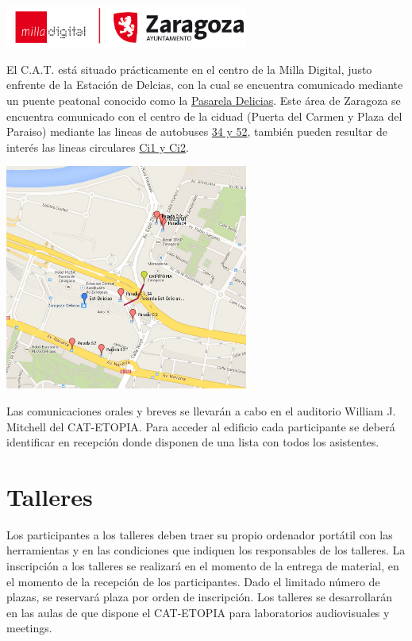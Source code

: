 \begin{center}
\includegraphics[width=0.6\textwidth]{Logos/logoMillaAyZgz.png}
\end{center}

El C.A.T. está situado prácticamente en el centro de la Milla Digital, 
justo enfrente de la Estación de Delcias, con la cual se encuentra 
comunicado mediante un puente peatonal conocido como la 
\href{http://www.puentemania.com/692}{Pasarela Delicias}.  Este área de 
Zaragoza se encuentra comunicado con el centro de la ciduad (Puerta del 
Carmen y Plaza del Paraiso) mediante las lineas de autobuses
\href{http://www.urbanosdezaragoza.es/frm_verdescarga.php?ref=175}{34 y 52},
también pueden resultar de interés las lineas circulares
\href{http://www.urbanosdezaragoza.es/frm_verdescarga.php?ref=175}{Ci1 y Ci2}.

\begin{center} 
\includegraphics[width=0.6\textwidth]{Logos/mapaParadas.png}
\end{center}



Las comunicaciones orales y breves se llevarán a cabo en el auditorio 
William J. Mitchell del CAT-ETOPIA. Para acceder al edificio cada 
participante se deberá identificar en recepción donde disponen de una 
lista con todos los asistentes.


\section{Talleres}

Los participantes a los talleres deben traer su propio ordenador portátil 
con las herramientas y en las condiciones que indiquen los responsables de 
los talleres. La inscripción a los talleres se realizará en el momento de 
la entrega de material, en el momento de la recepción de los participantes. 
Dado el limitado número de plazas, se reservará plaza por orden de inscripción. 
Los talleres se desarrollarán en las aulas de que dispone el CAT-ETOPIA 
para laboratorios audiovisuales y meetings.


